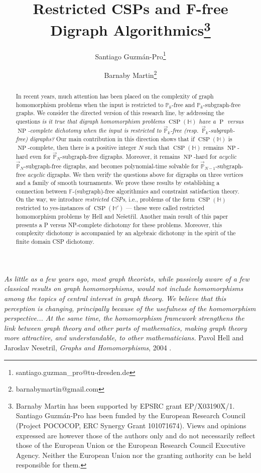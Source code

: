 \documentclass{article}
\title{Restricted CSPs and F-free Digraph Algorithmics\thanks{Barnaby Martin has been supported by EPSRC grant EP/X03190X/1. Santiago Guzm\'an-Pro has been funded by the European Research Council (Project POCOCOP, ERC Synergy Grant 101071674). Views and opinions expressed are however those of the authors only and do not necessarily reflect those of the European Union or the European Research Council Executive Agency. Neither the European Union nor the granting authority can be held responsible for them.}}
\author[1]{Santiago Guzm\'an-Pro\thanks{santiago.guzman\_pro@tu-dresden.de}}
\author[2]{Barnaby Martin\thanks{barnabymartin@gmail.com}}
\affil[1]{Institut f\"ur Algebra, TU Dresden}
\affil[2]{Durham University, UK}
\theoremstyle{definition}
\theoremstyle{remark}
\DeclareMathOperator{\NP}{NP}
\DeclareMathOperator{\cP}{P}
\DeclareMathOperator{\CSP}{CSP}
\newcommand{\bF}{{\mathbb F}}
\newcommand{\bH}{{\mathbb H}}
\newcommand{\bP}{{\mathbb P}}
\begin{document}
\date{}



\maketitle


\begin{abstract}
In recent years, much attention has been placed on the complexity of graph homomorphism problems when the input is restricted to 
$\bP_k$-free and $\bP_k$-subgraph-free graphs. We consider the directed version of this research line, by addressing the questions
\emph{is it true that digraph homomorphism problems $\CSP(\bH)$ have a $\cP$
versus $\NP$-complete dichotomy when the input is restricted to
$\vec{\bP}_k$-free (resp.\ $\vec{\bP}_k$-subgraph-free) digraphs?}
Our main contribution in this direction shows that if $\CSP(\bH)$ is $\NP$-complete, then there is
a positive integer $N$ such that $\CSP(\bH)$ remains $\NP$-hard even for $\vec{\bP}_N$-subgraph-free
digraphs. Moreover, it remains $\NP$-hard for \emph{acyclic} $\vec{\bP}_N$-subgraph-free
digraphs, and becomes polynomial-time solvable for $\vec{\bP}_{N-1}$-subgraph-free
\emph{acyclic} digraphs.
We then verify the  questions above for digraphs on three
vertices and a family of smooth tournaments.
We prove these results by establishing a connection between $\bF$-(subgraph)-free algorithmics
and constraint satisfaction theory.
On the way, we introduce \emph{restricted CSPs}, i.e., problems of the form $\CSP(\bH)$
restricted to yes-instances of $\CSP(\bH')$ --- these were called restricted homomorphism problems
by Hell and Ne\v{s}et\v{r}il.  Another main result of this paper presents a P versus NP-complete
dichotomy for these problems. Moreover, this complexity  dichotomy is accompanied by an algebraic
dichotomy in the spirit of the finite domain CSP dichotomy. 


\end{abstract}





\begin{flushright}
\emph{
As little as a few years ago, most graph theorists, while passively aware of a few classical results on graph homomorphisms, would not include homomorphisms among the topics of central interest in graph theory. We believe that this perception is changing, principally because of the usefulness of the homomorphism perspective...
At the same time, the homomorphism framework strengthens the link between graph theory and other parts of mathematics, making graph theory more attractive, and understandable, to other mathematicians.
}
Pavol Hell and Jaroslav Nesetril, \emph{Graphs and Homomorphisms}, 2004 \cite{HellNesetril}.
\end{flushright}
\end{document}

